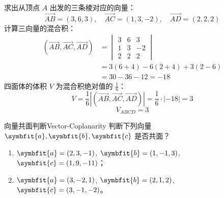 \begin{solution}
    求出从顶点 $A$ 出发的三条棱对应的向量：
    \begin{equation*}
        \overrightarrow{AB} = (3, 6, 3), \quad \overrightarrow{AC} = (1, 3, -2), \quad \overrightarrow{AD} = (2, 2, 2)
    \end{equation*}
    计算三向量的混合积：
    \begin{equation*}
        \begin{aligned}
            (\overrightarrow{AB}, \overrightarrow{AC}, \overrightarrow{AD}) & = \begin{vmatrix} 3 & 6 & 3 \\ 1 & 3 & -2 \\ 2 & 2 & 2 \end{vmatrix} \\
                                                                            & = 3(6 + 4) - 6(2 + 4) + 3(2 - 6)                                     \\
                                                                            & = 30 - 36 - 12 = -18
        \end{aligned}
    \end{equation*}
    四面体的体积 $V$ 为混合积绝对值的 $\frac{1}{6}$：
    \begin{equation*}
        V = \frac{1}{6} \left| (\overrightarrow{AB}, \overrightarrow{AC}, \overrightarrow{AD}) \right| = \frac{1}{6} \cdot |-18| = 3
    \end{equation*}
    \begin{equation*}
        \boxed{V_{ABCD} = 3}
    \end{equation*}
\end{solution}


\begin{problem}{向量共面判断}{Vector-Coplanarity}
    判断下列向量 $\symbfit{a}, \symbfit{b}, \symbfit{c}$ 是否共面？
    \begin{enumerate}
        \item $\symbfit{a} = (2, 3, -1)$, $\symbfit{b} = (1, -1, 3)$, $\symbfit{c} = (1, 9, -11)$；
        \item $\symbfit{a} = (3, -2, 1)$, $\symbfit{b} = (2, 1, 2)$, $\symbfit{c} = (3, -1, -2)$。
    \end{enumerate}
\end{problem}

